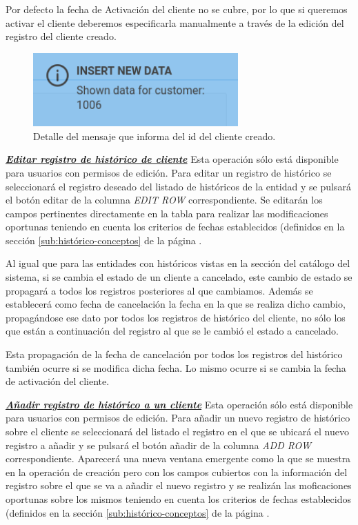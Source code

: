 Por defecto la fecha de Activación del cliente no se cubre, por lo que si queremos activar el cliente deberemos especificarla manualmente a través de la edición del registro del cliente creado.


\begin{figure}[H]
  \centering
  \includegraphics[width=0.70\textwidth]{imaxes/mensaje-id-cliente.png}
  \caption{Detalle del mensaje que informa del id del cliente creado.}
  \label{fig:mensaje-id-cliente}
\end{figure}


\underline{\textsl{\textbf{Editar registro de histórico de cliente}}}\newline
Esta operación sólo está disponible para usuarios con permisos de edición.
Para editar un registro de histórico se seleccionará el registro deseado del listado de históricos de la entidad y se pulsará el botón editar de la columna \textit{EDIT ROW} correspondiente. Se editarán los campos pertinentes directamente en la tabla para realizar las modificaciones oportunas teniendo en cuenta los criterios de fechas establecidos (definidos en la sección \ref{sub:histórico-conceptos} de la página \pageref{sub:histórico-conceptos}.

Al igual que para las entidades con históricos vistas en la sección del catálogo del sistema, si se cambia el estado de un cliente a cancelado, este cambio de estado se propagará a todos los registros posteriores al que cambiamos. Además se establecerá como fecha de cancelación la fecha en la que se realiza dicho cambio, propagándose ese dato por todos los registros de histórico del cliente, no sólo los que están a continuación del registro al que se le cambió el estado a cancelado.

Esta propagación de la fecha de cancelación por todos los registros del histórico  también ocurre si se modifica dicha fecha. Lo mismo ocurre si se cambia la fecha de activación del cliente.

\underline{\textsl{\textbf{Añadir registro de histórico a un cliente}}}\newline
Esta operación sólo está disponible para usuarios con permisos de edición.
Para añadir un nuevo registro de histórico sobre el cliente se seleccionará del listado el registro en el que se ubicará el nuevo registro a añadir y se pulsará el botón añadir de la columna \textit{ADD ROW} correspondiente. Aparecerá una nueva ventana emergente como la que se muestra en la operación de creación pero con los campos cubiertos con la información del registro sobre el que se va a añadir el nuevo registro y se realizán las moficaciones oportunas sobre los mismos teniendo en cuenta los criterios de fechas establecidos (definidos en la sección \ref{sub:histórico-conceptos} de la página \pageref{sub:histórico-conceptos}.


